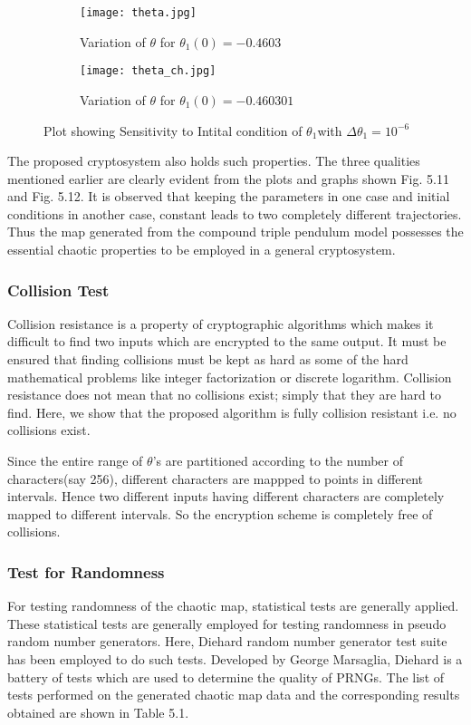 \begin{itemize}
\begin{figure}[H]
\begin{subfigure}{0.5\textwidth}
\texttt{[image: theta.jpg]}
\caption{Variation of ${\theta}$ for ${\theta_{1}(0)=-0.4603}$}\label{fig:theta_comp}
\end{subfigure}
\begin{subfigure}{0.5\textwidth}
\texttt{[image: theta\_ch.jpg]}
\caption{Variation of ${\theta}$ for ${\theta_{1}(0)=-0.460301}$}\label{fig:theta_ch_comp}
\end{subfigure}
\caption{Plot showing Sensitivity to Intital condition of ${\theta_{1}}$with ${\Delta \theta_{1} = 10^{-6}}$}\label{fig:image7}
\end{figure}

The proposed cryptosystem also holds such properties. The three qualities mentioned earlier are clearly evident from the plots and graphs shown Fig. 5.11 and Fig. 5.12. It is observed that keeping the parameters in one case and initial conditions in another case, constant leads to two completely different trajectories. Thus the map generated from the compound triple pendulum model possesses the essential chaotic properties to be employed in a general cryptosystem. 

\subsubsection{Collision Test}
Collision resistance is a property of cryptographic algorithms which makes it difficult to find two inputs which are encrypted to the same output. It must be ensured that finding collisions must be kept as hard as some of the hard mathematical problems like integer factorization  or discrete logarithm. Collision resistance does not mean that no collisions exist; simply that they are hard to find. Here, we show that the proposed algorithm is fully collision resistant i.e. no collisions exist.

Since the entire range of $\theta$'s are partitioned according to the number of characters(say 256), different characters are mappped to points in different intervals. Hence two different inputs having different characters are completely mapped to different intervals. So the encryption scheme is completely free of collisions. 

\subsubsection{Test for Randomness}
For testing randomness of the chaotic map, statistical tests are generally applied. These statistical tests are generally employed for testing randomness in pseudo random number generators. Here, Diehard random number generator test suite has been employed to do such tests. Developed by George Marsaglia, Diehard is a battery of tests which are used to determine the quality of PRNGs. The list of tests performed on the generated chaotic map data and the corresponding results obtained are shown in Table 5.1.


\end{itemize}
